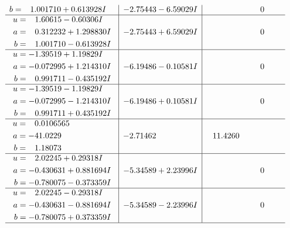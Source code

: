 \documentclass[1p]{elsarticle_modified}
\theoremstyle{definition}
\begin{document}
$$\begin{array}{c|c|c}
\begin{aligned}
b &= \phantom{-}1.001710 + 0.613928 I\end{aligned}
 & -2.75443 - 6.59029 I & \phantom{-0.000000 } 0 \\ \hline\begin{aligned}
u &= \phantom{-}1.60615 - 0.60306 I \\
a &= \phantom{-}0.312232 + 1.298830 I \\
b &= \phantom{-}1.001710 - 0.613928 I\end{aligned}
 & -2.75443 + 6.59029 I & \phantom{-0.000000 } 0 \\ \hline\begin{aligned}
u &= -1.39519 + 1.19829 I \\
a &= -0.072995 + 1.214310 I \\
b &= \phantom{-}0.991711 - 0.435192 I\end{aligned}
 & -6.19486 - 0.10581 I & \phantom{-0.000000 } 0 \\ \hline\begin{aligned}
u &= -1.39519 - 1.19829 I \\
a &= -0.072995 - 1.214310 I \\
b &= \phantom{-}0.991711 + 0.435192 I\end{aligned}
 & -6.19486 + 0.10581 I & \phantom{-0.000000 } 0 \\ \hline\begin{aligned}
u &= \phantom{-}0.0106565\phantom{ +0.000000I} \\
a &= -41.0229\phantom{ +0.000000I} \\
b &= \phantom{-}1.18073\phantom{ +0.000000I}\end{aligned}
 & -2.71462\phantom{ +0.000000I} & \phantom{-}11.4260\phantom{ +0.000000I} \\ \hline\begin{aligned}
u &= \phantom{-}2.02245 + 0.29318 I \\
a &= -0.430631 + 0.881694 I \\
b &= -0.780075 - 0.373359 I\end{aligned}
 & -5.34589 + 2.23996 I & \phantom{-0.000000 } 0 \\ \hline\begin{aligned}
u &= \phantom{-}2.02245 - 0.29318 I \\
a &= -0.430631 - 0.881694 I \\
b &= -0.780075 + 0.373359 I\end{aligned}
 & -5.34589 - 2.23996 I & \phantom{-0.000000 } 0\\
 \hline 
 \end{array}$$\newpage$$\begin{array}{c|c|c}  

\end{array}$$
\end{document}

